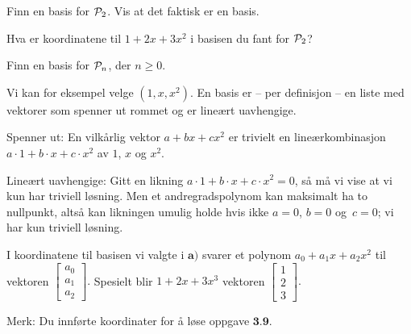 \begin{oppgave}

\begin{punkt}
Finn en basis for $\P_2$. Vis at det faktisk er en basis.
\end{punkt}

\begin{punkt}
Hva er koordinatene til $1+2x+3x^2$ i basisen du fant for $\P_2$?
\end{punkt}

\begin{punkt}
Finn en basis for $\P_n$, der $n \ge 0$.
\end{punkt}

\end{oppgave}

\begin{losning}


\begin{punkt}
Vi kan for eksempel velge $(1, x, x^2)$.
En basis er -- per definisjon -- en liste med vektorer som spenner ut rommet
og er lineært uavhengige.

\noindent
Spenner ut: En vilkårlig vektor $a+bx+cx^2$ er trivielt en lineærkombinasjon $a\cdot 1+b\cdot x+c\cdot x^2$ av $1$, $x$ og $x^2$.

\noindent
Lineært uavhengige: Gitt en likning $a\cdot 1+b\cdot x+c\cdot x^2=0$, så må vi vise at vi kun har triviell løsning. Men et andregradspolynom kan maksimalt ha to nullpunkt, altså kan likningen umulig holde hvis ikke $a=0$, $b=0$ og~$c=0$; vi har kun triviell løsning.
\end{punkt}


\begin{punkt}
I koordinatene til basisen vi valgte i $\textbf{a)}$ svarer et polynom $a_0+a_1x+a_2x^2$ til vektoren $\begin{bmatrix}
a_0\\
a_1\\
a_2
\end{bmatrix}.$ Spesielt blir $1+2x+3x^3$ vektoren $\begin{bmatrix}
1\\
2\\
3
\end{bmatrix}.$


\noindent
Merk: Du innførte koordinater for å løse oppgave $\textbf{3.9.}$
\end{punkt}

\end{losning}


